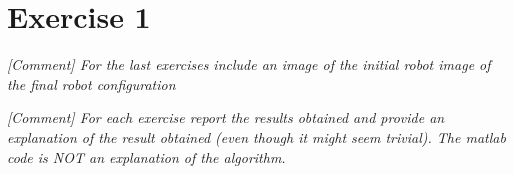 \section{Exercise 1} \label{P1}
\textit{[Comment] For the last exercises include an image of the initial robot image of the final robot configuration} 

\textit{[Comment] For each exercise report the results obtained and provide an explanation of the result obtained (even though it might seem trivial). The matlab code is NOT an explanation of the algorithm.} 